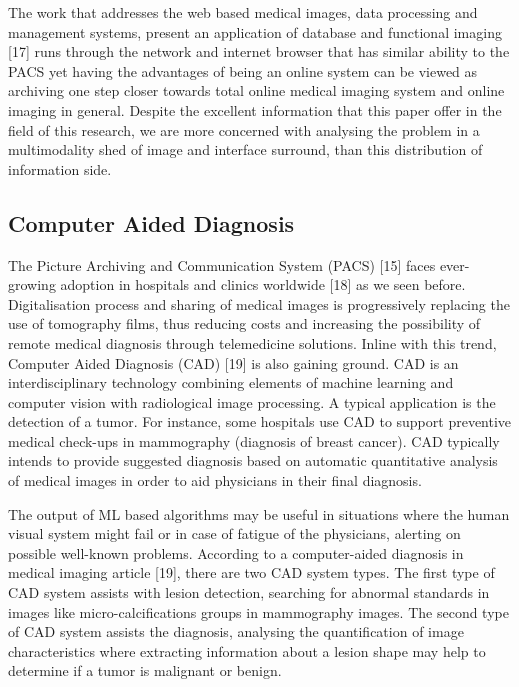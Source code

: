 The work that addresses the web based medical images, data processing and management systems, present an application of database and functional imaging [17] runs through the network and internet browser that has similar ability to the PACS yet having the advantages of being an online system can be viewed as archiving one step closer towards total online medical imaging system and online imaging in general. Despite the excellent information that this paper offer in the field of this research, we are more concerned with analysing the problem in a multimodality shed of image and interface surround, than this distribution of information side.

\subsection{Computer Aided Diagnosis}

The Picture Archiving and Communication System (PACS) [15] faces ever-growing adoption in hospitals and clinics worldwide [18] as we seen before. Digitalisation process and sharing of medical images is progressively replacing the use of tomography films, thus reducing costs and increasing the possibility of remote medical diagnosis through telemedicine solutions. Inline with this trend, Computer Aided Diagnosis (CAD) [19] is also gaining ground. CAD is an interdisciplinary technology combining elements of machine learning and computer vision with radiological image processing. A typical application is the detection of a tumor. For instance, some hospitals use CAD to support preventive medical check-ups in mammography (diagnosis of breast cancer). CAD typically intends to provide suggested diagnosis based on automatic quantitative analysis of medical images in order to aid physicians in their final diagnosis.

The output of ML based algorithms may be useful in situations where the human visual system might fail or in case of fatigue of the physicians, alerting on possible well-known problems. According to a computer-aided diagnosis in medical imaging article [19], there are two CAD system types. The first type of CAD system assists with lesion detection, searching for abnormal standards in images like micro-calcifications groups in mammography images. The second type of CAD system assists the diagnosis, analysing the quantification of image characteristics where extracting information about a lesion shape may help to determine if a tumor is malignant or benign.

\clearpage

